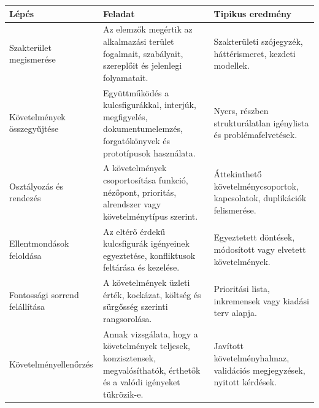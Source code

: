 \begin{tabularx}{\textwidth}{L{37mm}X X}
\toprule
\textbf{Lépés} & \textbf{Feladat} & \textbf{Tipikus eredmény} \\
\midrule
Szakterület megismerése & Az elemzők megértik az alkalmazási terület fogalmait, szabályait, szereplőit és jelenlegi folyamatait. & Szakterületi szójegyzék, háttérismeret, kezdeti modellek. \\
Követelmények összegyűjtése & Együttműködés a kulcsfigurákkal, interjúk, megfigyelés, dokumentumelemzés, forgatókönyvek és prototípusok használata. & Nyers, részben strukturálatlan igénylista és problémafelvetések. \\
Osztályozás és rendezés & A követelmények csoportosítása funkció, nézőpont, prioritás, alrendszer vagy követelménytípus szerint. & Áttekinthető követelménycsoportok, kapcsolatok, duplikációk felismerése. \\
Ellentmondások feloldása & Az eltérő érdekű kulcsfigurák igényeinek egyeztetése, konfliktusok feltárása és kezelése. & Egyeztetett döntések, módosított vagy elvetett követelmények. \\
Fontossági sorrend felállítása & A követelmények üzleti érték, kockázat, költség és sürgősség szerinti rangsorolása. & Prioritási lista, inkremensek vagy kiadási terv alapja. \\
Követelményellenőrzés & Annak vizsgálata, hogy a követelmények teljesek, konzisztensek, megvalósíthatók, érthetők és a valódi igényeket tükrözik-e. & Javított követelményhalmaz, validációs megjegyzések, nyitott kérdések. \\
\bottomrule
\end{tabularx}
